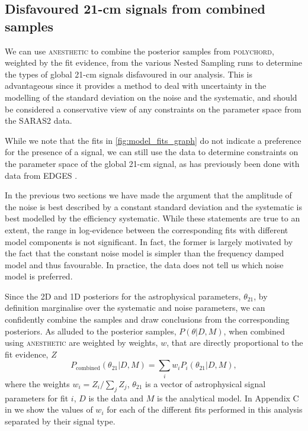 \subsection{Disfavoured 21-cm signals from combined samples}
\label{sec:disfavoured_regions_combined_samples}

We can use \textsc{anesthetic} \citep{anesthetic} to combine the posterior samples from \textsc{polychord}, weighted by the fit evidence, from the various Nested Sampling runs to determine the types of global 21-cm signals disfavoured in our analysis. This is advantageous since it provides a method to deal with uncertainty in the modelling of the standard deviation on the noise and the systematic, and should be considered a conservative view of any constraints on the parameter space from the SARAS2 data.

While we note that the fits in \cref{fig:model_fits_graph} do not indicate a preference for the presence of a signal, we can still use the data to determine constraints on the parameter space of the global 21-cm signal, as has previously been done with data from EDGES \citep{Monsalve_EDGES_HB_3_2019}.

In the previous two sections we have made the argument that the amplitude of the noise is best described by a constant standard deviation and the systematic is best modelled by the efficiency systematic. While these statements are true to an extent, the range in log-evidence between the corresponding fits with different model components is not significant. In fact, the former is largely motivated by the fact that the constant noise model is simpler than the frequency damped model and thus favourable. In practice, the data does not tell us which noise model is preferred.

Since the 2D and 1D posteriors for the astrophysical parameters, $\theta_{21}$, by definition marginalise over the systematic and noise parameters, we can confidently combine the samples and draw conclusions from the corresponding posteriors. As alluded to the posterior samples, $P(\theta|D, M)$, when combined using \textsc{anesthetic} are weighted by weights, $w$, that are directly proportional to the fit evidence, $Z$
\begin{equation}
    P_\mathrm{combined}(\theta_{21}|D, M) = \sum_i w_i P_i(\theta_{21}|D, M),
    \label{eq:combined_samples}
\end{equation}
where the weights $w_i = Z_i/\sum_j Z_j$, $\theta_{21}$ is a vector of astrophysical signal parameters for fit $i$, $D$ is the data and $M$ is the analytical model. In Appendix C in \cite{Bevins_SARAS2_2022} we show the values of $w_i$ for each of the different fits performed in this analysis separated by their signal type.

